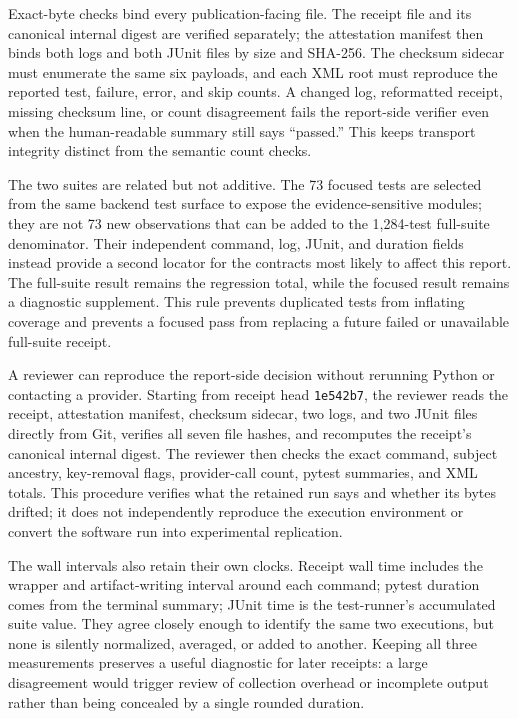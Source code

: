 Exact-byte checks bind every publication-facing file. The receipt file and its
canonical internal digest are verified separately; the attestation manifest
then binds both logs and both JUnit files by size and SHA-256. The checksum
sidecar must enumerate the same six payloads, and each XML root must reproduce
the reported test, failure, error, and skip counts. A changed log, reformatted
receipt, missing checksum line, or count disagreement fails the report-side
verifier even when the human-readable summary still says ``passed.'' This
keeps transport integrity distinct from the semantic count checks.

The two suites are related but not additive. The 73 focused tests are selected
from the same backend test surface to expose the evidence-sensitive modules;
they are not 73 new observations that can be added to the 1,284-test full-suite
denominator. Their independent command, log, JUnit, and duration fields instead
provide a second locator for the contracts most likely to affect this report.
The full-suite result remains the regression total, while the focused result
remains a diagnostic supplement. This rule prevents duplicated tests from
inflating coverage and prevents a focused pass from replacing a future failed
or unavailable full-suite receipt.

A reviewer can reproduce the report-side decision without rerunning Python or
contacting a provider. Starting from receipt head \texttt{1e542b7}, the
reviewer reads the receipt, attestation manifest, checksum sidecar, two logs,
and two JUnit files directly from Git, verifies all seven file hashes, and
recomputes the receipt's canonical internal digest. The reviewer then checks
the exact command, subject ancestry, key-removal flags, provider-call count,
pytest summaries, and XML totals. This procedure verifies what the retained
run says and whether its bytes drifted; it does not independently reproduce
the execution environment or convert the software run into experimental
replication.

The wall intervals also retain their own clocks. Receipt wall time includes
the wrapper and artifact-writing interval around each command; pytest duration
comes from the terminal summary; JUnit time is the test-runner's accumulated
suite value. They agree closely enough to identify the same two executions,
but none is silently normalized, averaged, or added to another. Keeping all
three measurements preserves a useful diagnostic for later receipts: a large
disagreement would trigger review of collection overhead or incomplete output
rather than being concealed by a single rounded duration.

